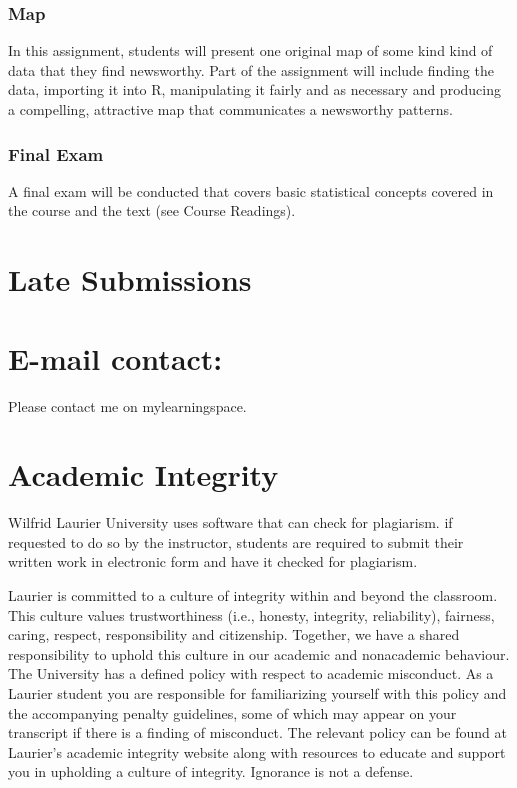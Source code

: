 \documentclass{article}
\begin{document}
\subsubsection*{Map}
In this assignment, students will present one original map of some kind kind of data that they find newsworthy. Part of the assignment will include finding the data, importing it into R, manipulating it fairly and as necessary and producing a compelling, attractive map that communicates a newsworthy patterns. 

\subsubsection*{Final Exam}
A final exam will be conducted that covers basic statistical concepts covered in the course and the text \textcite{stray_curious_2016} (see Course Readings).

\section*{Late Submissions}

\section*{E-mail contact:}
Please contact me on mylearningspace.

\section*{Academic Integrity}
Wilfrid Laurier University uses software that can check for plagiarism. if requested to do so by the instructor, students are required to submit their written work in electronic form and have it checked for plagiarism.

Laurier is committed to a culture of integrity within and beyond the classroom. This culture values trustworthiness (i.e., honesty, integrity, reliability), fairness, caring, respect, responsibility and citizenship. Together, we have a shared responsibility to uphold this culture in our academic and nonacademic behaviour. The University has a defined policy with respect to academic misconduct. As a Laurier student you are responsible for familiarizing yourself with this policy and the accompanying penalty guidelines, some of which may appear on your transcript if there is a finding of misconduct. The relevant policy can be found at Laurier's academic integrity website along with resources to educate and support you in upholding a culture of integrity. Ignorance is not a defense.
\end{document}
